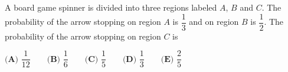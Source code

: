 A board game spinner is divided into three regions labeled $A$, $B$ and $C$. The probability of the arrow stopping on region $A$ is $\dfrac13$ and on region $B$ is $\dfrac12$. The probability of the arrow stopping on region $C$ is

$\textbf{(A) } \dfrac1{12}\qquad\textbf{(B) } \dfrac16\qquad\textbf{(C) } \dfrac15\qquad\textbf{(D) } \dfrac13\qquad\textbf{(E) } \dfrac25$
